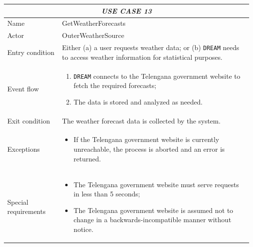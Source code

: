 \documentclass{article}
\begin{document}
\centering
\begin{tabular}{|p{3.5cm}|m{8cm}|}
 \hline
 \multicolumn{2}{|c|}{\emph{USE CASE 13}} \\
 \hline
 Name & GetWeatherForecasts\\
 \hline
 Actor & OuterWeatherSource\\
 \hline
 Entry condition & Either (a) a user requests weather data; or (b) \verb|DREAM| needs to access weather information for statistical purposes.\\
 \hline
 Event flow & \begin{enumerate}
    \item \verb|DREAM| connects to the Telengana government website to fetch the required forecasts;
    \item The data is stored and analyzed as needed.
 \end{enumerate}\\
 \hline
 Exit condition & The weather forecast data is collected by the system.\\
 \hline
 Exceptions & \begin{itemize}
     \item If the Telengana government website is currently unreachable, the process is aborted and an error is returned.
 \end{itemize}\\
 \hline
 Special requirements &\begin{itemize}
     \item The Telengana government website must serve requests in less than 5 seconds;
     \item The Telengana government website is assumed not to change in a backwards-incompatible manner without notice.
 \end{itemize}\\
 \hline
\end{tabular}
\end{document}
